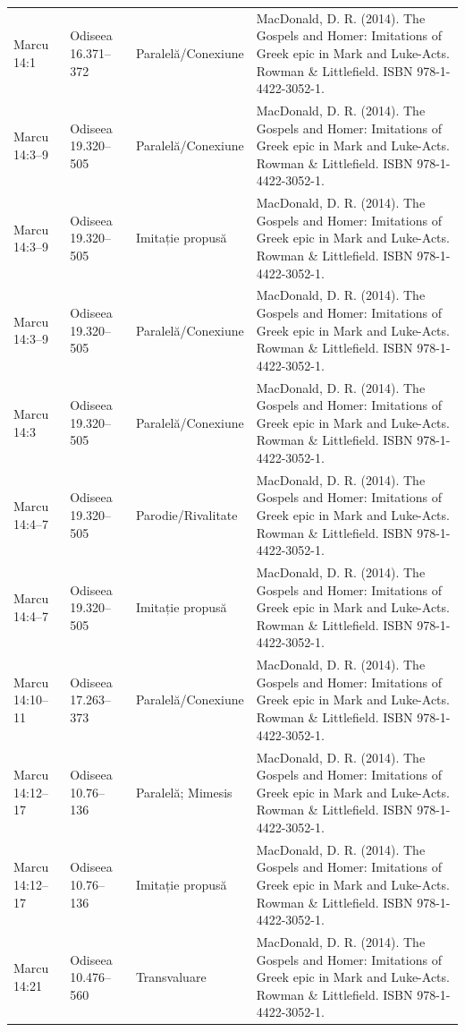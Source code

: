 \documentclass[12pt,a4paper,twoside,openany]{book}
\begin{document}
\begin{longtable}{L{1.4cm}L{1.7cm}L{3.1cm}L{8.4cm}}
Marcu 14:1 & Odiseea 16.371–372 & Paralelă/Conexiune & MacDonald, D. R. (2014). The Gospels and Homer: Imitations of Greek epic in Mark and Luke-Acts. Rowman \& Littlefield. ISBN 978-1-4422-3052-1. \\
Marcu 14:3–9 & Odiseea 19.320–505 & Paralelă/Conexiune & MacDonald, D. R. (2014). The Gospels and Homer: Imitations of Greek epic in Mark and Luke-Acts. Rowman \& Littlefield. ISBN 978-1-4422-3052-1. \\
Marcu 14:3–9 & Odiseea 19.320–505 & Imitație propusă & MacDonald, D. R. (2014). The Gospels and Homer: Imitations of Greek epic in Mark and Luke-Acts. Rowman \& Littlefield. ISBN 978-1-4422-3052-1. \\
Marcu 14:3–9 & Odiseea 19.320–505 & Paralelă/Conexiune & MacDonald, D. R. (2014). The Gospels and Homer: Imitations of Greek epic in Mark and Luke-Acts. Rowman \& Littlefield. ISBN 978-1-4422-3052-1. \\
Marcu 14:3 & Odiseea 19.320–505 & Paralelă/Conexiune & MacDonald, D. R. (2014). The Gospels and Homer: Imitations of Greek epic in Mark and Luke-Acts. Rowman \& Littlefield. ISBN 978-1-4422-3052-1. \\
Marcu 14:4–7 & Odiseea 19.320–505 & Parodie/Rivalitate & MacDonald, D. R. (2014). The Gospels and Homer: Imitations of Greek epic in Mark and Luke-Acts. Rowman \& Littlefield. ISBN 978-1-4422-3052-1. \\
Marcu 14:4–7 & Odiseea 19.320–505 & Imitație propusă & MacDonald, D. R. (2014). The Gospels and Homer: Imitations of Greek epic in Mark and Luke-Acts. Rowman \& Littlefield. ISBN 978-1-4422-3052-1. \\
Marcu 14:10–11 & Odiseea 17.263–373 & Paralelă/Conexiune & MacDonald, D. R. (2014). The Gospels and Homer: Imitations of Greek epic in Mark and Luke-Acts. Rowman \& Littlefield. ISBN 978-1-4422-3052-1. \\
Marcu 14:12–17 & Odiseea 10.76–136 & Paralelă; Mimesis & MacDonald, D. R. (2014). The Gospels and Homer: Imitations of Greek epic in Mark and Luke-Acts. Rowman \& Littlefield. ISBN 978-1-4422-3052-1. \\
Marcu 14:12–17 & Odiseea 10.76–136 & Imitație propusă & MacDonald, D. R. (2014). The Gospels and Homer: Imitations of Greek epic in Mark and Luke-Acts. Rowman \& Littlefield. ISBN 978-1-4422-3052-1. \\
Marcu 14:21 & Odiseea 10.476–560 & Transvaluare & MacDonald, D. R. (2014). The Gospels and Homer: Imitations of Greek epic in Mark and Luke-Acts. Rowman \& Littlefield. ISBN 978-1-4422-3052-1. \\

\end{longtable}
\end{document}
